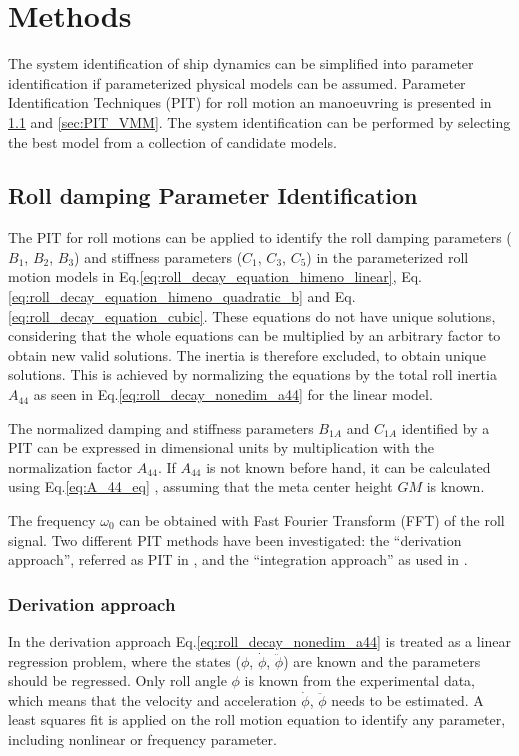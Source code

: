 \chapter{Methods\label{ch:methods}}
The system identification of ship dynamics can be simplified into parameter identification if parameterized physical models can be assumed. Parameter Identification Techniques (PIT) for roll motion an manoeuvring is presented in \ref{sec:PIT_roll} and \ref{sec:PIT_VMM}. The system identification can be performed by selecting the best model from a collection of candidate models.

\section{Roll damping Parameter Identification} \label{sec:PIT_roll}
\noindent The PIT for roll motions can be applied to identify the roll damping parameters ($B_1$, $B_2$, $B_3$) and stiffness parameters ($C_1$, $C_3$, $C_5$) in the parameterized roll motion models in Eq.\ref{eq:roll_decay_equation_himeno_linear}, Eq.\ref{eq:roll_decay_equation_himeno_quadratic_b} and Eq.\ref{eq:roll_decay_equation_cubic}. These equations do not have unique solutions, considering that the whole equations can be multiplied by an arbitrary factor to obtain new valid solutions. The inertia is therefore excluded, to obtain unique solutions. This is achieved by normalizing the equations by the total roll inertia $A_{44}$ as seen in Eq.\ref{eq:roll_decay_nonedim_a44} for the linear model.



\noindent The normalized damping and stiffness parameters $B_{1A}$ and $C_{1A}$ identified by a PIT can be expressed in dimensional units by multiplication with the normalization factor $A_{44}$. If $A_{44}$ is not known before hand, it can be calculated using Eq.\ref{eq:A_44_eq} \cite{piehl_ship_2016}, assuming that the meta center height $GM$ is known.


\noindent The frequency $\omega_0$ can be obtained with Fast Fourier Transform (FFT) of the roll signal. 
Two different PIT methods have been investigated: the ``derivation approach'', referred as PIT in \parencite{imo_1200_2006}, and the ``integration approach'' as used in \cite{soder_assessment_2019}. 

\subsection{Derivation approach}\label{sec:derivation_approach}
In the derivation approach Eq.\ref{eq:roll_decay_nonedim_a44} is treated as a linear regression problem, where the states ($\phi$, $\dot{\phi}$, $\ddot{\phi}$) are known and the parameters should be regressed. Only roll angle $\phi$ is known from the experimental data, which means that the velocity and acceleration $\dot{\phi}$, $\ddot{\phi}$ needs to be estimated. A least squares fit is applied on the roll motion equation to identify any parameter, including nonlinear or frequency parameter. 

